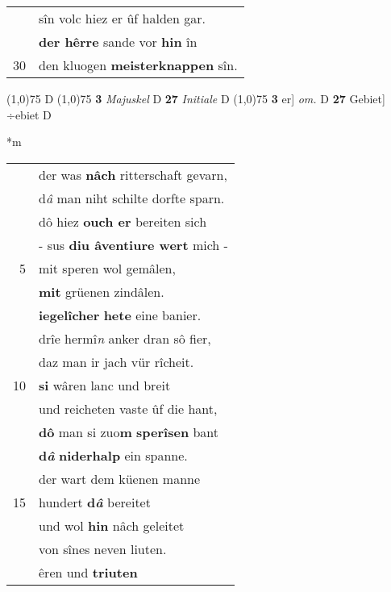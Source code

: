 \documentclass[8pt,a4paper,notitlepage]{article}
\begin{document}
\begin{table}[ht]
\begin{minipage}[t]{0.5\linewidth}
\begin{tabular}{rl}
 & sîn volc hiez er ûf halden gar.\\ 
 & \textbf{der hêrre} sande vor \textbf{hin} în\\ 
30 & den kluogen \textbf{meisterknappen} sîn.\\ 
\end{tabular}
\scriptsize
\line(1,0){75} \newline
D \newline
\line(1,0){75} \newline
\textbf{3} \textit{Majuskel} D  \textbf{27} \textit{Initiale} D  \newline
\line(1,0){75} \newline
\textbf{3} er] \textit{om.} D \textbf{27} Gebiet] ÷ebiet D \newline
\end{minipage}
\hspace{0.5cm}
\begin{minipage}[t]{0.5\linewidth}
\small
\begin{center}*m
\end{center}
\begin{tabular}{rl}
 & der was \textbf{nâch} ritterschaft gevarn,\\ 
 & d\textit{â} man niht schilte dorfte sparn.\\ 
 & dô hiez \textbf{ouch er} bereiten sich\\ 
 & - sus \textbf{diu âventiure wert} mich -\\ 
5 & mit speren wol gemâlen,\\ 
 & \textbf{mit} grüenen zindâlen.\\ 
 & \textbf{iegelîcher} \textbf{hete} eine banier.\\ 
 & drîe hermî\textit{n} anker dran sô fier,\\ 
 & daz man ir jach vür rîcheit.\\ 
10 & \textbf{si} wâren lanc und breit\\ 
 & und reicheten vaste ûf die hant,\\ 
 & \textbf{dô} man si zuo\textbf{m} \textbf{sperîsen} bant\\ 
 & \textbf{d\textit{â}} \textbf{niderhalp} ein spanne.\\ 
 & der wart dem küenen manne\\ 
15 & hundert \textbf{d\textit{â}} bereitet\\ 
 & und wol \textbf{hin} nâch geleitet\\ 
 & von sînes neven liuten.\\ 
 & êren und \textbf{triuten}\\ 

\end{tabular}
\end{minipage}
\end{table}
\end{document}
